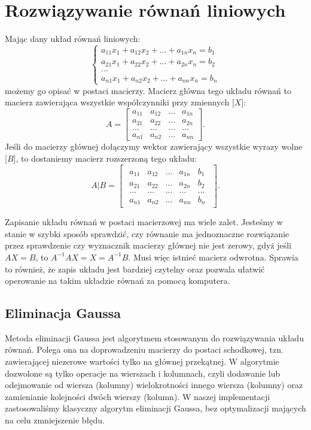 \section{Rozwiązywanie równań liniowych}

Mając dany układ równań liniowych:
$$
\begin{cases}
    a_{11}x_1+a_{12}x_2+...+a_{1n}x_n=b_1\\
    a_{21}x_1+a_{22}x_2+...+a_{2n}x_n=b_2\\
    ...\\
    a_{n1}x_1+a_{n2}x_2+...+a_{nn}x_n=b_n
\end{cases}
$$
możemy go opisać w postaci macierzy. Macierz główna tego układu równań to macierz zawierająca wszystkie współczynniki przy zmiennych [$X$]:
$$A=\begin{bmatrix}
    a_{11}&a_{12}&...&a_{1n}\\
    a_{21}&a_{22}&...&a_{2n}\\
    ...&...&...&...\\
    a_{n1}&a_{n2}&...&a_{nn}
\end{bmatrix}.$$
Jeśli do macierzy głównej dołączymy wektor zawierający wszystkie wyrazy wolne [$B$], to dostaniemy macierz rozszerzoną tego układu:
$$
A|B=\begin{bmatrix}\begin{array}{cccc|c}
    a_{11}&a_{12}&...&a_{1n}&b_1\\
    a_{21}&a_{22}&...&a_{2n}&b_2\\
    ...&...&...&...&...\\
    a_{n1}&a_{n2}&...&a_{nn}&b_n
\end{array}\end{bmatrix}.
$$

Zapisanie układu równań w postaci macierzowej ma wiele zalet. Jesteśmy w stanie w szybki sposób sprawdzić, czy równanie ma jednoznaczne rozwiązanie przez sprawdzenie czy wyznacznik macierzy głównej nie jest zerowy, gdyż jeśli $AX=B$, to $A^{-1}AX=X=A^{-1}B$. Musi więc istnieć macierz odwrotna. Sprawia to również, że zapis układu jest bardziej czytelny oraz pozwala ułatwić operowanie na takim układzie równań za pomocą komputera.

\subsection{Eliminacja Gaussa}

Metoda eliminacji Gaussa jest algorytmem stosowanym do rozwiązywania układu równań. Polega ona na doprowadzeniu macierzy do postaci schodkowej, tzn. zawierającej niezerowe wartości tylko na głównej przekątnej. W algorytmie dozwolone są tylko operacje na wierszach i kolumnach, czyli dodawanie lub odejmowanie od wiersza (kolumny) wielokrotności innego wiersza (kolumny) oraz zamienianie kolejności dwóch wierszy (kolumn). W naszej implementacji zastosowaliśmy klasyczny algorytm eliminacji Gaussa, bez optymalizacji mających na celu zmniejszenie błędu.

